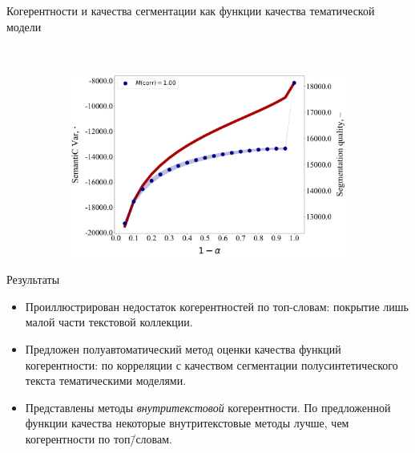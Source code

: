 \documentclass[sans, mathsans, russian]{beamer}
\begin{document}
\begin{frame}{Когерентности и качества сегментации как функции качества тематической модели}
\begin{figure}[h]
\begin{subfigure}[t]{0.48\textwidth}
    \end{subfigure}
    ~
    \begin{subfigure}[t]{0.48\textwidth}
      \includegraphics[width=\linewidth]{semantic_var-iteration.jpg}
    \end{subfigure}
  \end{figure}
\end{frame}


\begin{frame}{Результаты}
  \begin{itemize}\setlength\itemsep{0.5cm}
  \item Проиллюстрирован недостаток когерентностей по топ-словам: покрытие лишь малой части текстовой коллекции.

  \item Предложен полуавтоматический метод оценки качества функций когерентности: по корреляции с качеством сегментации полусинтетического текста тематическими моделями.

  \item Представлены методы \emph{внутритекстовой} когерентности.
    По предложенной функции качества некоторые внутритекстовые методы лучше, чем когерентности по топ\=/словам.
  \end{itemize}
\end{frame}
\end{document}
